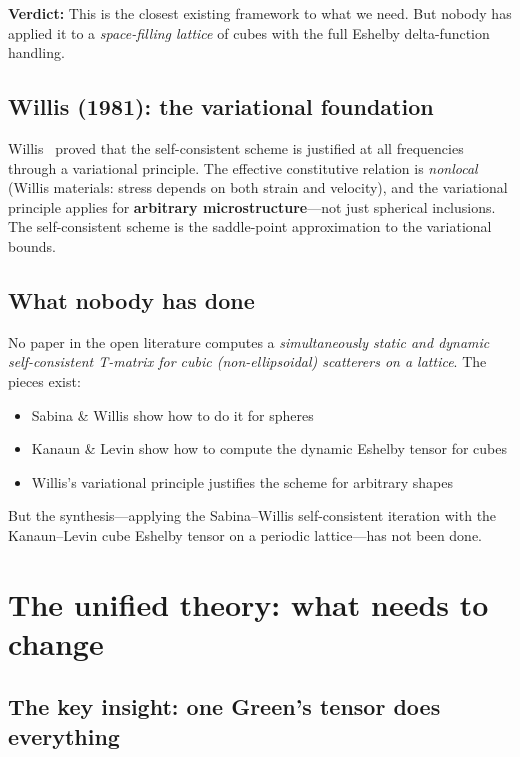 \documentclass[11pt,a4paper]{article}
\begin{document}
\textbf{Verdict:} This is the closest existing framework to what we
need.  But nobody has applied it to a \emph{space-filling lattice}
of cubes with the full Eshelby delta-function handling.

\subsection{Willis (1981): the variational foundation}

Willis~\cite{willis1981} proved that the self-consistent scheme is
justified at all frequencies through a variational principle.  The
effective constitutive relation is \emph{nonlocal} (Willis materials:
stress depends on both strain and velocity), and the variational
principle applies for \textbf{arbitrary microstructure}---not just
spherical inclusions.  The self-consistent scheme is the saddle-point
approximation to the variational bounds.

\subsection{What nobody has done}

No paper in the open literature computes a \emph{simultaneously
static and dynamic self-consistent T-matrix for cubic (non-ellipsoidal)
scatterers on a lattice}.  The pieces exist:
\begin{itemize}[nosep]
  \item Sabina \& Willis show how to do it for spheres
  \item Kanaun \& Levin show how to compute the dynamic Eshelby
    tensor for cubes
  \item Willis's variational principle justifies the scheme for
    arbitrary shapes
\end{itemize}
But the synthesis---applying the Sabina--Willis self-consistent
iteration with the Kanaun--Levin cube Eshelby tensor on a periodic
lattice---has not been done.

\section{The unified theory: what needs to change}
\label{sec:unified}

\subsection{The key insight: one Green's tensor does everything}
\end{document}
